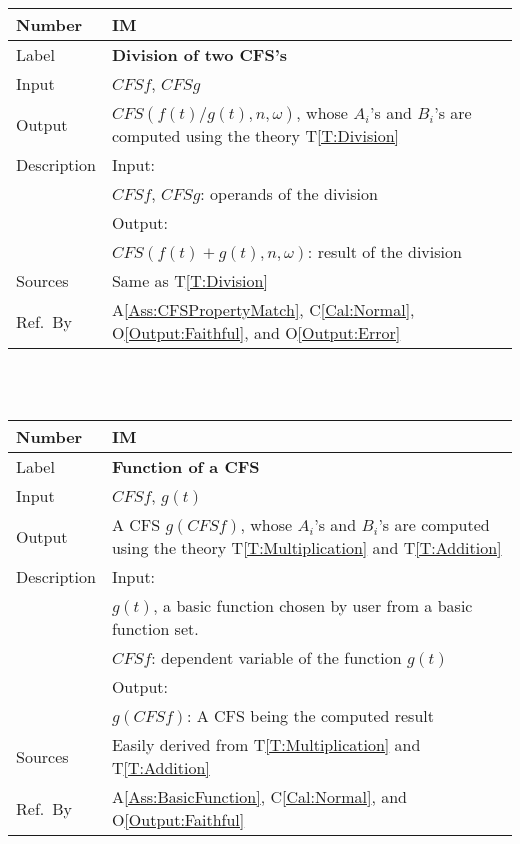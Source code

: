 \documentclass[12pt]{article}
\newcommand{\colAwidth}{0.13\textwidth}
\newcommand{\colBwidth}{0.82\textwidth}
\newcommand{\tref}[1]{T\ref{#1}}
\newcommand{\aref}[1]{A\ref{#1}}
\newcommand{\calref}[1]{C\ref{#1}}
\newcommand{\oref}[1]{O\ref{#1}}
\newcounter{instnum} %
\begin{document}
\noindent
\begin{minipage}{\textwidth}
	\renewcommand*{\arraystretch}{1.5}
	\begin{tabular}{| p{\colAwidth} | p{\colBwidth}|}
		\hline
		\rowcolor[gray]{0.9}
		Number& IM{instnum}\theinstnum 
		\label{IM:Division}\\
		\hline
		Label& \bf Division of two CFS's \\
		\hline
		Input& $\mathit{CFSf}$, $\mathit{CFSg}$\\
		\hline
		Output& $\mathit{CFS}(f(t)/g(t), n, \omega)$, whose $A_i$'s 
		and $B_i$'s are computed using the theory 
		\tref{T:Division}\\
		\hline
		Description&Input:\\
		&$\mathit{CFSf}$, $\mathit{CFSg}$: operands of 
		the division\\
		&Output:\\
		& $\mathit{CFS}(f(t)+g(t), n, \omega)$: result of 
		the division\\
		\hline
		Sources&Same as \tref{T:Division}		\\
		\hline
		Ref.\ By & \aref{Ass:CFSPropertyMatch}, 
		\calref{Cal:Normal}, 
		\oref{Output:Faithful}, and \oref{Output:Error}\\
		\hline
	\end{tabular}
\end{minipage}\\
~\newline

\noindent
\begin{minipage}{\textwidth}
	\renewcommand*{\arraystretch}{1.5}
	\begin{tabular}{| p{\colAwidth} | p{\colBwidth}|}
		\hline
		\rowcolor[gray]{0.9}
		Number& IM{instnum}\theinstnum 
		\label{IM:Function}\\
		\hline
		Label& \bf Function of a CFS \\
		\hline
		Input& $\mathit{CFSf}$, $g(t)$\\
		\hline
		Output& A CFS $g(CFSf)$, whose $A_i$'s and $B_i$'s 
		are computed using the theory \tref{T:Multiplication} 
		and \tref{T:Addition}\\
		\hline
		Description&Input:\\
		& $g(t)$, a basic function chosen by user from a 
		basic function set.\\
		&$\mathit{CFSf}$: dependent variable of the function $g(t)$\\
		&Output:\\
		& $g(CFSf)$: A CFS being the computed result\\
		\hline
		Sources&Easily derived from \tref{T:Multiplication} 
		and \tref{T:Addition}\\
		\hline
		Ref.\ By & \aref{Ass:BasicFunction}, \calref{Cal:Normal}, 
		and \oref{Output:Faithful}\\
		\hline
	\end{tabular}
\end{minipage}\\
~\newline
\end{document}
